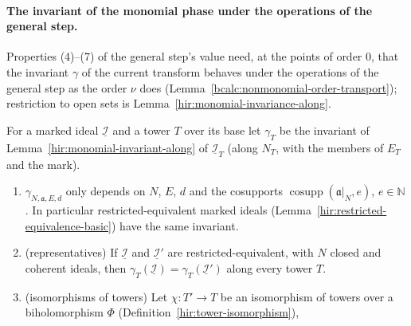 \paragraph{The invariant of the monomial phase under the operations of the general step.} Properties (4)--(7) of the general step's value need, at the
points of order \(0\), that the invariant \(\gamma\) of the current transform behaves under the operations of the general step as the order \(\nu\) does
(Lemma~\ref{bcalc:nonmonomial-order-transport}); restriction to open sets is Lemma~\ref{hir:monomial-invariance-along}.

\begin{lemma}
\label{bcalc:nonmonomial-order-monomial-transport}
\mixedleanok
For a marked ideal \(\underline{\mathcal I}\) and a tower \(T\) over its base let \(\gamma_T\) be the invariant of Lemma~\ref{hir:monomial-invariant-along} of
\(\underline{\mathcal I}_T\) (along \(N_T\), with the members of \(E_T\) and the mark).
\begin{enumerate}
\item \(\gamma_{N,\mathfrak a,E,d}\) only depends on \(N\), \(E\), \(d\) and the cosupports \(\operatorname{cosupp}(\mathfrak a|_N,e)\), \(e\in\mathbb N\). In particular restricted-equivalent
marked ideals (Lemma~\ref{hir:restricted-equivalence-basic}) have the same invariant.
\item (representatives) If \(\underline{\mathcal I}\) and \(\underline{\mathcal I}'\) are restricted-equivalent, with \(N\) closed and coherent ideals, then
\(\gamma_T(\underline{\mathcal I})=\gamma_T(\underline{\mathcal I}')\) along every tower \(T\).
\item (isomorphisms of towers) Let \(\chi\colon T'\to T\) be an isomorphism of towers over a biholomorphism \(\Phi\) (Definition~\ref{hir:tower-isomorphism}),

\end{enumerate}
\end{lemma}
